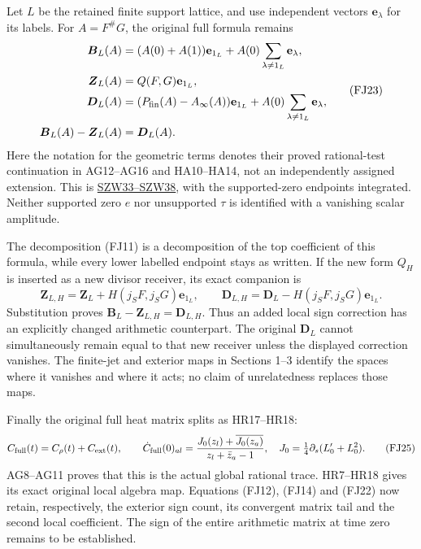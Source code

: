 \documentclass[
  10pt,
  a4paper,
]{article}
\begin{document}
Let \(L\) be the retained finite support lattice, and use independent
vectors \(\mathbf e_\lambda\) for its labels. For \(A=F^\#G\), the
original full formula remains \[
\begin{aligned}
\boldsymbol B_L(A)&=(A(0)+A(1))\mathbf e_{1_L}
              +A(0)\sum_{\lambda\ne1_L}\mathbf e_\lambda,\\
\boldsymbol Z_L(A)&=Q(F,G)\mathbf e_{1_L},\\
\boldsymbol D_L(A)&=(P_{\rm fin}(A)-A_\infty(A))\mathbf e_{1_L}
              +A(0)\sum_{\lambda\ne1_L}\mathbf e_\lambda,\\
\boldsymbol B_L(A)-\boldsymbol Z_L(A)&=\boldsymbol D_L(A).
\end{aligned}\tag{FJ23}
\] Here the notation for the geometric terms denotes their proved
rational-test continuation in AG12--AG16 and HA10--HA14, not an
independently assigned extension. This is
\href{https://github.com/KokunoYumeto/zeta-function-research-reader/blob/3c022a0adde0a6aa3d8fc8e43ef42795d88e44b0/workbenches/splitzero-tandem/branches/tau-zero-prime-positivity/SUPPORTED_ZERO_PRIME_WEIL_DERIVATION.md}{SZW33--SZW38},
with the supported-zero endpoints integrated. Neither supported zero
\(e\) nor unsupported \(\tau\) is identified with a vanishing scalar
amplitude.

The decomposition (FJ11) is a decomposition of the top coefficient of
this formula, while every lower labelled endpoint stays as written. If
the new form \(Q_H\) is inserted as a new divisor receiver, its exact
companion is \[
\boldsymbol Z_{L,H}=\boldsymbol Z_L+H(j_SF,j_SG)\mathbf e_{1_L},
\qquad
\boldsymbol D_{L,H}=\boldsymbol D_L-H(j_SF,j_SG)\mathbf e_{1_L}.
\tag{FJ24}
\] Substitution proves
\(\boldsymbol B_L-\boldsymbol Z_{L,H}=\boldsymbol D_{L,H}\). Thus an
added local sign correction has an explicitly changed arithmetic
counterpart. The original \(\boldsymbol D_L\) cannot simultaneously
remain equal to that new receiver unless the displayed correction
vanishes. The finite-jet and exterior maps in Sections 1--3 identify the
spaces where it vanishes and where it acts; no claim of unrelatedness
replaces those maps.

Finally the original full heat matrix splits as HR17--HR18: \[
C_{\rm full}(t)=C_\rho(t)+C_{\rm ext}(t),\qquad
\dot C_{\rm full}(0)_{al}
=\frac{J_0(z_l)+\overline{J_0(z_a)}}{z_l+\bar z_a-1},\quad
J_0=\tfrac14\partial_s(L_0'+L_0^2).
\tag{FJ25}
\] AG8--AG11 proves that this is the actual global rational trace.
HR7--HR18 gives its exact original local algebra map. Equations (FJ12),
(FJ14) and (FJ22) now retain, respectively, the exterior sign count, its
convergent matrix tail and the second local coefficient. The sign of the
entire arithmetic matrix at time zero remains to be established.
\end{document}
